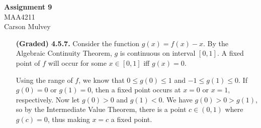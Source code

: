 \documentclass[11pt,letterpaper]{article}
\begin{document}
\begin{center}
    \begin{large}
        \textbf{Assignment 9} \\
        MAA4211 \\
        Carson Mulvey
    \end{large}
\end{center}

\begin{enumerate}
    \item[\textbf{(Graded) 4.5.7.}]
        Consider the function $g(x)=f(x)-x$. By the Algebraic Continuity Theorem, $g$ is continuous on interval $[0,1]$. A fixed point of $f$ will occur for some $x\in [0,1]$ iff $g(x)=0$.
        
        Using the range of $f$, we know that $0\leq g(0)\leq 1$ and $-1\leq g(1)\leq 0$. If $g(0)=0$ or $g(1)=0$, then a fixed point occurs at $x=0$ or $x=1$, respectively. Now let $g(0)>0$ and $g(1)<0$. We have $g(0)>0>g(1)$, so by the Intermediate Value Theorem, there is a point $c\in (0,1)$ where $g(c)=0$, thus making $x=c$ a fixed point.
\end{enumerate}
\end{document}
